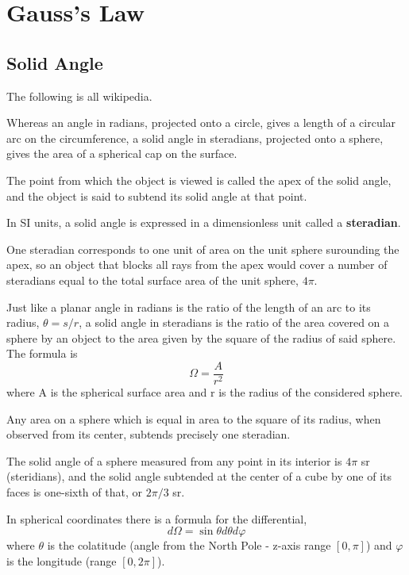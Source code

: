 \section{Gauss's Law}




\subsection{Solid Angle}

The following is all wikipedia.

Whereas an angle in radians, projected onto a circle, gives a length of a circular arc
on the circumference, a solid angle in steradians, projected onto a sphere,
gives the area of a spherical cap on the surface.

The point from which the object is viewed is called the apex of the solid angle,
and the object is said to subtend its solid angle at that point.

In SI units, a solid angle is expressed in a dimensionless unit called a \textbf{steradian}.

One steradian corresponds to one unit of area on the unit sphere surounding the apex,
so an object that blocks all rays from the apex would cover a number of steradians equal
to the total surface area of the unit sphere, $4\pi$.


Just like a planar angle in radians is the ratio of the length of an arc to its radius, $\theta = s/r$,
a solid angle in steradians is the ratio of the area covered on a sphere by an object to the area given
by the square of the radius of said sphere. The formula is
$$
\Omega = \frac{A}{r^2}
$$
where A is the spherical surface area and r is the radius of the considered sphere.

Any area on a sphere which is equal in area to the square of its radius,
when observed from its center, subtends precisely one steradian.

The solid angle of a sphere measured from any point in its interior is $4\pi$ sr (steridians),
and the solid angle subtended at the center of a cube by one of its faces is one-sixth of that,
or $2\pi/3$ sr.

In spherical coordinates there is a formula for the differential,
$$
d\Omega = \sin \theta d\theta d\varphi 
$$
where $\theta$ is the colatitude (angle from the North Pole - z-axis range $[0,\pi]$)
and $\varphi$ is the longitude (range $[0,2\pi]$).

